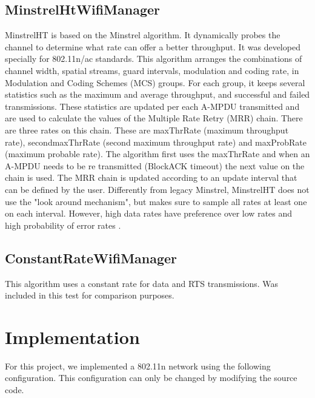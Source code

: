 \documentclass[12]{article}
\begin{document}
\subsection{MinstrelHtWifiManager}
MinstrelHT is based on the Minstrel algorithm. It dynamically probes the channel to determine what rate can offer a better throughput. It was developed specially for 802.11n/ac standards. This algorithm arranges the combinations of channel width, spatial streams, guard intervals, modulation and coding rate, in Modulation and Coding Schemes (MCS) groups. For each group, it keeps several statistics such as the maximum and average throughput, and successful and failed transmissions. These statistics are updated per each A-MPDU transmitted and are used to calculate the values of the Multiple Rate Retry (MRR) chain. There are three rates on this chain. These are maxThrRate (maximum throughput rate), secondmaxThrRate (second maximum throughput rate) and maxProbRate (maximum probable rate). The algorithm first uses the maxThrRate and when an A-MPDU needs to be re transmitted (BlockACK timeout) the next value on the chain is used. The MRR chain is updated according to an update interval that can be defined by the user. Differently from legacy Minstrel, MinstrelHT does not use the "look around mechanism", but makes sure to sample all rates at least one on each interval. However, high data rates have preference over low rates and high probability of error rates \citep{minstrelht}.


\subsection{ConstantRateWifiManager}
This algorithm uses a constant rate for data and RTS transmissions. Was included in this test for comparison purposes.


\section{Implementation} \label{implementation}

For this project, we implemented a 802.11n network using the following configuration. This configuration can only be changed by modifying the source code.
\end{document}
